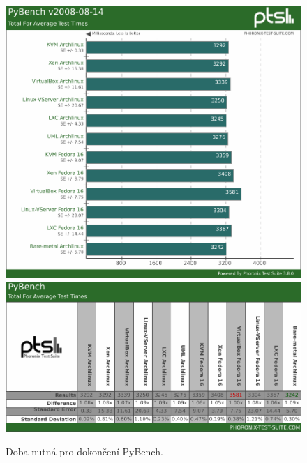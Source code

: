 \begin{figure}[h!]
  \centering
  \includegraphics[width=15cm]{obr/bench/pybench-graph}
  \includegraphics[width=15cm]{obr/bench/pybench-table}
  \caption{Doba nutná pro dokončení PyBench.}
  \label{obr:bench:pybench}
\end{figure}

